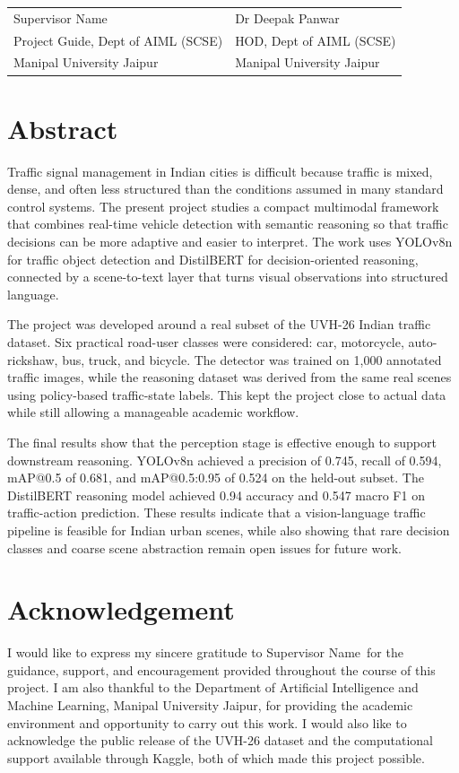 \documentclass[12pt,a4paper]{report}
\newcommand{\supervisorName}{Supervisor Name}
\newcommand{\hodName}{Dr Deepak Panwar}
\begin{document}
\vspace{2cm}

\begin{tabular}{p{} p{}}
\supervisorName & \hodName \\
Project Guide, Dept of AIML (SCSE) & HOD, Dept of AIML (SCSE) \\
Manipal University Jaipur & Manipal University Jaipur \\
\end{tabular}

\clearpage
{}

\chapter*{Abstract}
Traffic signal management in Indian cities is difficult because traffic is mixed, dense, and often less structured than the conditions assumed in many standard control systems. The present project studies a compact multimodal framework that combines real-time vehicle detection with semantic reasoning so that traffic decisions can be more adaptive and easier to interpret. The work uses YOLOv8n for traffic object detection and DistilBERT for decision-oriented reasoning, connected by a scene-to-text layer that turns visual observations into structured language.

The project was developed around a real subset of the UVH-26 Indian traffic dataset. Six practical road-user classes were considered: car, motorcycle, auto-rickshaw, bus, truck, and bicycle. The detector was trained on 1,000 annotated traffic images, while the reasoning dataset was derived from the same real scenes using policy-based traffic-state labels. This kept the project close to actual data while still allowing a manageable academic workflow.

The final results show that the perception stage is effective enough to support downstream reasoning. YOLOv8n achieved a precision of 0.745, recall of 0.594, mAP@0.5 of 0.681, and mAP@0.5:0.95 of 0.524 on the held-out subset. The DistilBERT reasoning model achieved 0.94 accuracy and 0.547 macro F1 on traffic-action prediction. These results indicate that a vision-language traffic pipeline is feasible for Indian urban scenes, while also showing that rare decision classes and coarse scene abstraction remain open issues for future work.

\chapter*{Acknowledgement}
I would like to express my sincere gratitude to \supervisorName\ for the guidance, support, and encouragement provided throughout the course of this project. I am also thankful to the Department of Artificial Intelligence and Machine Learning, Manipal University Jaipur, for providing the academic environment and opportunity to carry out this work. I would also like to acknowledge the public release of the UVH-26 dataset and the computational support available through Kaggle, both of which made this project possible.
\end{document}

